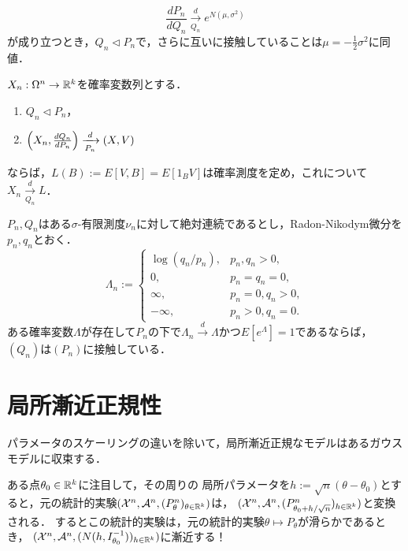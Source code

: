 \documentclass[uplatex,dvipdfmx]{jsreport}
\begin{document}
\begin{example}[漸近的対数正規性]
    \[\frac{dP_n}{dQ_n}\xrightarrow[Q_n]{d}e^{N(\mu,\sigma^2)}\]
    が成り立つとき，$Q_n\triangleleft P_n$で，さらに互いに接触していることは$\mu=-\frac{1}{2}\sigma^2$に同値．
\end{example}

\begin{theorem}
    $X_n:\Omega^n\to\mathbb{R}^k$を確率変数列とする．
    \begin{enumerate}
        \item $Q_n\triangleleft P_n$，
        \item $\left(X_n,\frac{dQ_n}{dP_n}\right)\xrightarrow[P_n]{d}(X,V)$
    \end{enumerate}
    ならば，$L(B):=E[V,B]=E[1_BV]$は確率測度を定め，これについて$X_n\xrightarrow[Q_n]{d}L$．
\end{theorem}

\begin{lemma}[接触性の十分条件]
    $P_n,Q_n$はある$\sigma$-有限測度$\nu_n$に対して絶対連続であるとし，Radon-Nikodym微分を$p_n,q_n$とおく．
    \[\Lambda_n:=\begin{cases}
        \log(q_n/p_n),&p_n,q_n>0,\\
        0,&p_n=q_n=0,\\
        \infty,&p_n=0,q_n>0,\\
        -\infty,&p_n>0,q_n=0.
    \end{cases}\]
    ある確率変数$\Lambda$が存在して$P_n$の下で$\Lambda_n\xrightarrow{d}\Lambda$かつ$E[e^\Lambda]=1$であるならば，$(Q_n)$は$(P_n)$に接触している．
\end{lemma}

\section{局所漸近正規性}

\begin{tcolorbox}[colframe=ForestGreen, colback=ForestGreen!10!white,breakable,colbacktitle=ForestGreen!40!white,coltitle=black,fonttitle=\bfseries\sffamily,
title=]
パラメータのスケーリングの違いを除いて，局所漸近正規なモデルはあるガウスモデルに収束する．
\end{tcolorbox}

\begin{discussion}
    ある点$\theta_0\in\mathbb{R}^k$に注目して，その周りの
    局所パラメータを$h:=\sqrt{n}(\theta-\theta_0)$とすると，元の統計的実験$(\mathcal{X}^n,\mathcal{A}^n,(P_\theta^n)_{\theta\in\mathbb{R}^k})$は，
    $(\mathcal{X}^n,\mathcal{A}^n,(P^n_{\theta_0+h/\sqrt{n}})_{h\in\mathbb{R}^k})$と変換される．
    するとこの統計的実験は，元の統計的実験$\theta\mapsto P_\theta$が滑らかであるとき，
    $(\mathcal{X}^n,\mathcal{A}^n,(N(h,I_{\theta_0}^{-1}))_{h\in\mathbb{R}^k})$に漸近する！
\end{discussion}
\end{document}
